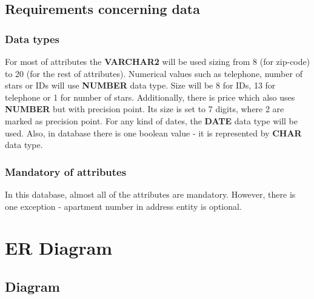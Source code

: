\documentclass{article}
\begin{document}
\subsection{Requirements concerning data}
\subsubsection{Data types}
For most of attributes the \textbf{VARCHAR2} will be used sizing from 8 (for zip-code) to 20 (for the rest of attributes).
Numerical values such as telephone, number of stars or IDs will use \textbf{NUMBER} data type. Size will be 8 for IDs, 13 for telephone or 1 for number of stars.
Additionally, there is price which also uses \textbf{NUMBER} but with precision point. Its size is set to 7 digits, where 2 are marked as precision point. 
For any kind of dates, the \textbf{DATE} data type will be used. Also, in database there is one boolean value - it is represented by \textbf{CHAR} data type. 
\subsubsection{Mandatory of attributes}
In this database, almost all of the attributes are mandatory. However, there is one exception - apartment number in address entity is optional.
\newpage
\section{ER Diagram}
\subsection{Diagram}
\begin{figure}[ht]
\end{figure}
\end{document}
